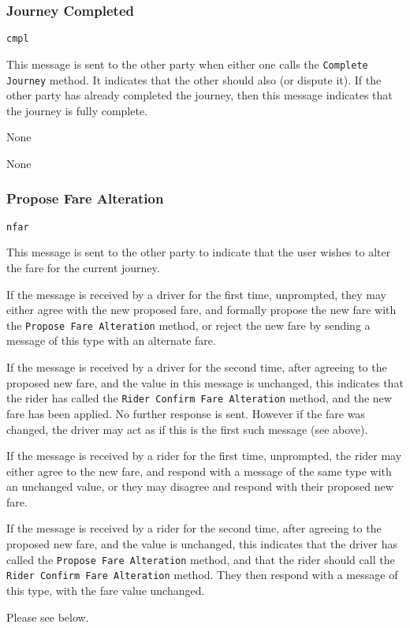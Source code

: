 

\subsubsection{Journey Completed}

\begin{description}[leftmargin=6em,style=nextline]
	\item [Topic]
		\lstinline{cmpl}
	\item [Purpose]
		This message is sent to the other party when either one calls the \lstinline{Complete Journey} method. It indicates that the other should also (or dispute it). If the other party has already completed the journey, then this message indicates that the journey is fully complete.
	\item [Response]
		None
	\item [Payload]
		None
\end{description}

\subsubsection{Propose Fare Alteration}

\begin{description}[leftmargin=6em,style=nextline]
	\item [Topic]
		\lstinline{nfar}
	\item [Purpose]
		This message is sent to the other party to indicate that the user wishes to alter the fare for the current journey.
	\item [Response]
		If the message is received by a driver for the first time, unprompted, they may either agree with the new proposed fare, and formally propose the new fare with the \lstinline{Propose Fare Alteration} method, or reject the new fare by sending a message of this type with an alternate fare.
		
		If the message is received by a driver for the second time, after agreeing to the proposed new fare, and the value in this message is unchanged, this indicates that the rider has called the \lstinline{Rider Confirm Fare Alteration} method, and the new fare has been applied. No further response is sent. However if the fare was changed, the driver may act as if this is the first such message (see above).
		
		If the message is received by a rider for the first time, unprompted, the rider may either agree to the new fare, and respond with a message of the same type with an unchanged value, or they may disagree and respond with their proposed new fare.
		
		If the message is received by a rider for the second time, after agreeing to the proposed new fare, and the value is unchanged, this indicates that the driver has called the \lstinline{Propose Fare Alteration} method, and that the rider should call the \lstinline{Rider Confirm Fare Alteration} method. They then respond with a message of this type, with the fare value unchanged.
	\item [Payload]
		Please see below.
\end{description}

